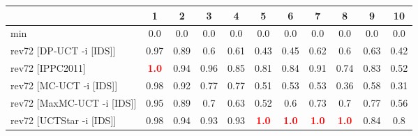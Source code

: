\documentclass{article}
\begin{document}
\begin{tabular}{|l|r@{$\pm$}rr@{$\pm$}rr@{$\pm$}rr@{$\pm$}rr@{$\pm$}rr@{$\pm$}rr@{$\pm$}rr@{$\pm$}rr@{$\pm$}rr@{$\pm$}r|}
\hline

& \multicolumn{2}{c}{1}
& \multicolumn{2}{c}{2}
& \multicolumn{2}{c}{3}
& \multicolumn{2}{c}{4}
& \multicolumn{2}{c}{5}
& \multicolumn{2}{c}{6}
& \multicolumn{2}{c}{7}
& \multicolumn{2}{c}{8}
& \multicolumn{2}{c}{9}
& \multicolumn{2}{c|}{10}
\\
\hline
\hline
min
& \multicolumn{2}{c}{0.0}
& \multicolumn{2}{c}{0.0}
& \multicolumn{2}{c}{0.0}
& \multicolumn{2}{c}{0.0}
& \multicolumn{2}{c}{0.0}
& \multicolumn{2}{c}{0.0}
& \multicolumn{2}{c}{0.0}
& \multicolumn{2}{c}{0.0}
& \multicolumn{2}{c}{0.0}
& \multicolumn{2}{c|}{0.0}
\\
rev72 [DP-UCT -i [IDS]]
& \multicolumn{2}{c}{0.97}
& \multicolumn{2}{c}{0.89}
& \multicolumn{2}{c}{0.6}
& \multicolumn{2}{c}{0.61}
& \multicolumn{2}{c}{0.43}
& \multicolumn{2}{c}{0.45}
& \multicolumn{2}{c}{0.62}
& \multicolumn{2}{c}{0.6}
& \multicolumn{2}{c}{0.63}
& \multicolumn{2}{c|}{0.42}
\\
rev72 [IPPC2011]
& \multicolumn{2}{c}{\textbf{\textcolor{red}{1.0}}}
& \multicolumn{2}{c}{0.94}
& \multicolumn{2}{c}{0.96}
& \multicolumn{2}{c}{0.85}
& \multicolumn{2}{c}{0.81}
& \multicolumn{2}{c}{0.84}
& \multicolumn{2}{c}{0.91}
& \multicolumn{2}{c}{0.74}
& \multicolumn{2}{c}{0.83}
& \multicolumn{2}{c|}{0.52}
\\
rev72 [MC-UCT -i [IDS]]
& \multicolumn{2}{c}{0.98}
& \multicolumn{2}{c}{0.92}
& \multicolumn{2}{c}{0.77}
& \multicolumn{2}{c}{0.77}
& \multicolumn{2}{c}{0.51}
& \multicolumn{2}{c}{0.53}
& \multicolumn{2}{c}{0.53}
& \multicolumn{2}{c}{0.36}
& \multicolumn{2}{c}{0.58}
& \multicolumn{2}{c|}{0.31}
\\
rev72 [MaxMC-UCT -i [IDS]]
& \multicolumn{2}{c}{0.95}
& \multicolumn{2}{c}{0.89}
& \multicolumn{2}{c}{0.7}
& \multicolumn{2}{c}{0.63}
& \multicolumn{2}{c}{0.52}
& \multicolumn{2}{c}{0.6}
& \multicolumn{2}{c}{0.73}
& \multicolumn{2}{c}{0.7}
& \multicolumn{2}{c}{0.77}
& \multicolumn{2}{c|}{0.56}
\\
rev72 [UCTStar -i [IDS]]
& \multicolumn{2}{c}{0.98}
& \multicolumn{2}{c}{0.94}
& \multicolumn{2}{c}{0.93}
& \multicolumn{2}{c}{0.93}
& \multicolumn{2}{c}{\textbf{\textcolor{red}{1.0}}}
& \multicolumn{2}{c}{\textbf{\textcolor{red}{1.0}}}
& \multicolumn{2}{c}{\textbf{\textcolor{red}{1.0}}}
& \multicolumn{2}{c}{\textbf{\textcolor{red}{1.0}}}
& \multicolumn{2}{c}{0.84}
& \multicolumn{2}{c|}{0.8}
\\

\end{tabular}
\end{document}
